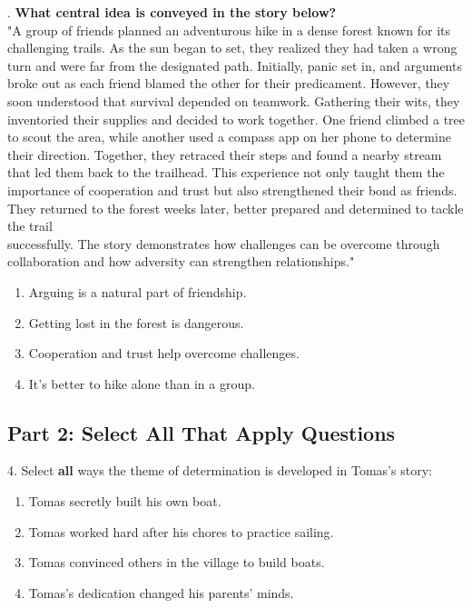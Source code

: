 \documentclass[12pt]{article}
\begin{document}
\vspace{1cm}
. \textbf{What central idea is conveyed in the story below?\\}
"A group of friends planned an adventurous hike in a dense forest known for its challenging trails. As the sun began to set, they realized they had taken a wrong turn and were far from the designated path. Initially, panic set in, and arguments broke out as each friend blamed the other for their predicament. However, they soon understood that survival depended on teamwork. Gathering their wits, they inventoried their supplies and decided to work together. One friend climbed a tree to scout the area, while another used a compass app on her phone to determine their direction. Together, they retraced their steps and found a nearby stream that led them back to the trailhead. This experience not only taught them the importance of cooperation and trust but also strengthened their bond as friends. They returned to the forest weeks later, better prepared and determined to tackle the trail \\successfully. The story demonstrates how challenges can be overcome through collaboration and how adversity can strengthen relationships."  
\begin{enumerate}[label=\Alph*.]
    \item Arguing is a natural part of friendship.  
    \item Getting lost in the forest is dangerous.  
    \item Cooperation and trust help overcome challenges.  
    \item It’s better to hike alone than in a group.  
\end{enumerate}



\subsection*{Part 2: Select All That Apply Questions}

4. Select \textbf{all} ways the theme of determination is developed in Tomas’s story:  
\begin{enumerate}[label=\Alph*.]
    \item Tomas secretly built his own boat.  
    \item Tomas worked hard after his chores to practice sailing.  
    \item Tomas convinced others in the village to build boats.  
    \item Tomas’s dedication changed his parents’ minds.  
\end{enumerate}
\end{document}

